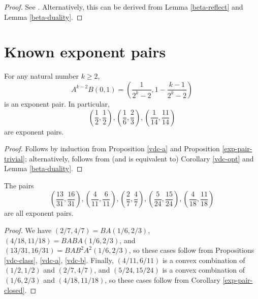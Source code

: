 \literature
{}

\begin{proof}  See \cite[Lemma 2.9]{ivic}.  Alternatively, this can be derived from Lemma \ref{beta-reflect} and Lemma \ref{beta-duality}.
\end{proof}


\section{Known exponent pairs}


\begin{proposition}\label{vdc-class} For any natural number $k \geq 2$,
    $$ A^{k-2} B(0,1) = \left( \frac{1}{2^k-2}, 1 - \frac{k-1}{2^k-2} \right)$$
    is an exponent pair.  In particular,
    $$ \left(\frac{1}{2}, \frac{1}{2}\right), \left(\frac{1}{6}, \frac{2}{3}\right), \left(\frac{1}{14}, \frac{11}{14}\right)$$
    are exponent pairs.
    \end{proposition}

    \begin{proof} Follows by induction from Proposition \ref{vdc-a} and Proposition \ref{exp-pair-trivial}; alternatively, follows from (and is equivalent to) Corollary \ref{vdc-opt} and Lemma \ref{beta-duality}.
    \end{proof}

\derived
{}

\begin{corollary}\label{add-exponential}  The pairs
$$ \left(\frac{13}{31}, \frac{16}{31}\right), \left(\frac{4}{11},\frac{6}{11}\right), \left(\frac{2}{7},\frac{4}{7}\right), \left(\frac{5}{24},\frac{15}{24}\right), \left(\frac{4}{18},\frac{11}{18}\right)$$
are all exponent pairs.
\end{corollary}

\derived
{}

\begin{proof} We have $(2/7,4/7) = BA(1/6,2/3)$, $(4/18,11/18) = BABA(1/6,2/3)$, and $(13/31, 16/31)=BAB^2A^2(1/6,2/3)$, so these cases follow from Propositions \ref{vdc-class}, \ref{vdc-a}, \ref{vdc-b}. Finally, $(4/11,6/11)$ is a convex combination of $(1/2,1/2)$ and $(2/7,4/7)$, and $(5/24, 15/24)$ is a convex combination of $(1/6,2/3)$ and $(4/18, 11/18)$, so these cases follow from Corollary \ref{exp-pair-closed}.
\end{proof}


